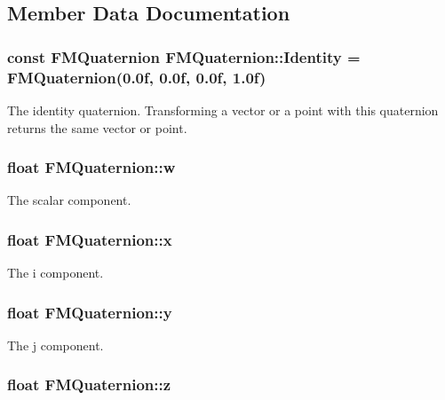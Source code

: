 \subsection{Member Data Documentation}
\hypertarget{classFMQuaternion_a7dccc8f53d6f730b27f784416a53052b}{
\subsubsection[{Identity}]{\setlength{\rightskip}{0pt plus 5cm}const {\bf FMQuaternion} {\bf FMQuaternion::Identity} = {\bf FMQuaternion}(0.0f, 0.0f, 0.0f, 1.0f)}}
\label{classFMQuaternion_a7dccc8f53d6f730b27f784416a53052b}
The identity quaternion. Transforming a vector or a point with this quaternion returns the same vector or point. \hypertarget{classFMQuaternion_ac60123167417258df35a27db4d3e7646}{
\subsubsection[{w}]{\setlength{\rightskip}{0pt plus 5cm}float {\bf FMQuaternion::w}}}
\label{classFMQuaternion_ac60123167417258df35a27db4d3e7646}
The scalar component. \hypertarget{classFMQuaternion_a036c642a43fb84dc5544eb4ce0e0828d}{
\subsubsection[{x}]{\setlength{\rightskip}{0pt plus 5cm}float {\bf FMQuaternion::x}}}
\label{classFMQuaternion_a036c642a43fb84dc5544eb4ce0e0828d}
The i component. \hypertarget{classFMQuaternion_a996bf6bcb013dbbbe8e255c35e085f81}{
\subsubsection[{y}]{\setlength{\rightskip}{0pt plus 5cm}float {\bf FMQuaternion::y}}}
\label{classFMQuaternion_a996bf6bcb013dbbbe8e255c35e085f81}
The j component. \hypertarget{classFMQuaternion_a03d06578ec64cf8a4d2032c336153244}{
\subsubsection[{z}]{\setlength{\rightskip}{0pt plus 5cm}float {\bf FMQuaternion::z}}}
